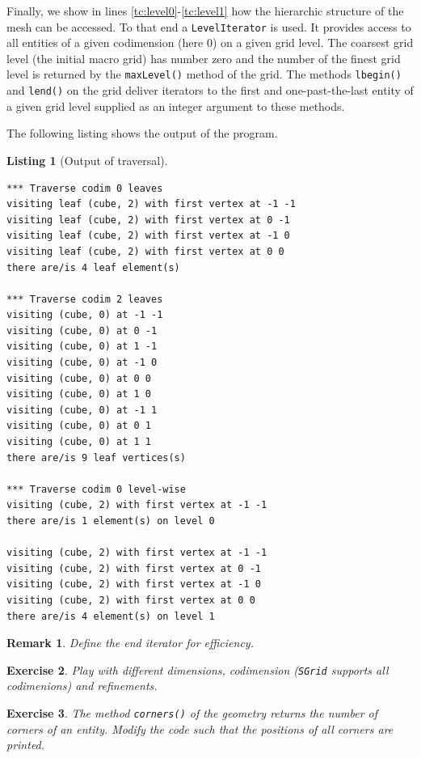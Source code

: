 \documentclass[11pt,a4paper,headinclude,footinclude,DIV16,normalheadings]{scrreprt}
\newtheorem{exc}{Exercise}[chapter]
\newtheorem{rem}[exc]{Remark}
\newtheorem{lst}{Listing}
\begin{document}
Finally, we show in lines \ref{tc:level0}-\ref{tc:level1} how the
hierarchic structure of the mesh can be accessed. To that end a
\lstinline!LevelIterator! is used. It provides access to all entities
of a given codimension (here 0) on a given grid level. The coarsest
grid level (the initial macro grid) has number zero and the number of
the finest grid level is returned by the \lstinline!maxLevel()! method
of the grid.  The methods \lstinline!lbegin()! and \lstinline!lend()!
on the grid deliver iterators to the first and one-past-the-last
entity of a given grid level supplied as an integer argument to these
methods.

The following listing shows the output of the program.

\begin{lst}[Output of traversal] \mbox{}

\begin{lstlisting}[basicstyle=\ttfamily\scriptsize]
*** Traverse codim 0 leaves
visiting leaf (cube, 2) with first vertex at -1 -1
visiting leaf (cube, 2) with first vertex at 0 -1
visiting leaf (cube, 2) with first vertex at -1 0
visiting leaf (cube, 2) with first vertex at 0 0
there are/is 4 leaf element(s)

*** Traverse codim 2 leaves
visiting (cube, 0) at -1 -1
visiting (cube, 0) at 0 -1
visiting (cube, 0) at 1 -1
visiting (cube, 0) at -1 0
visiting (cube, 0) at 0 0
visiting (cube, 0) at 1 0
visiting (cube, 0) at -1 1
visiting (cube, 0) at 0 1
visiting (cube, 0) at 1 1
there are/is 9 leaf vertices(s)

*** Traverse codim 0 level-wise
visiting (cube, 2) with first vertex at -1 -1
there are/is 1 element(s) on level 0

visiting (cube, 2) with first vertex at -1 -1
visiting (cube, 2) with first vertex at 0 -1
visiting (cube, 2) with first vertex at -1 0
visiting (cube, 2) with first vertex at 0 0
there are/is 4 element(s) on level 1
\end{lstlisting}
\end{lst}

\begin{rem} Define the end iterator for efficiency. 
\end{rem}

\begin{exc} Play with different dimensions, codimension
  (\lstinline!SGrid! supports all codimenions) and refinements.
\end{exc}

\begin{exc} The method \lstinline!corners()! of the geometry returns
  the number of corners of an entity. Modify the code such that the
  positions of all corners are printed.
\end{exc}
\end{document}
